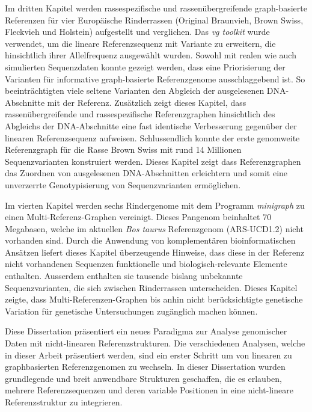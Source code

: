 \documentclass[11 pt, a4paper, notitlepage, twoside]{report}
\begin{document}
Im dritten Kapitel werden rassespezifische und rassenübergreifende  graph-basierte Referenzen für vier Europäische Rinderrassen (Original Braunvieh, Brown Swiss, Fleckvieh und Holstein) aufgestellt und verglichen. Das \emph{vg toolkit} wurde verwendet, um die lineare Referenzsequenz mit Variante zu erweitern, die hinsichtlich ihrer Allelfrequenz ausgewählt wurden. Sowohl mit realen wie auch simulierten Sequenzdaten konnte gezeigt werden, dass eine Priorisierung der Varianten für informative graph-basierte Referenzgenome ausschlaggebend ist. So beeinträchtigten viele seltene Varianten den Abgleich der ausgelesenen DNA-Abschnitte mit der Referenz. Zusätzlich zeigt dieses Kapitel, dass rassenübergreifende und rassespezifische Referenzgraphen hinsichtlich des Abgleichs der DNA-Abschnitte eine fast identische Verbesserung gegenüber der linearen Referenzsequenz  aufweisen. Schlussendlich konnte der erste genomweite Referenzgraph für die Rasse Brown Swiss mit rund 14 Millionen Sequenzvarianten konstruiert werden. Dieses Kapitel zeigt dass Referenzgraphen das Zuordnen von ausgelesenen DNA-Abschnitten erleichtern und somit eine unverzerrte Genotypisierung von Sequenzvarianten ermöglichen.

\thispagestyle{plain}

Im vierten Kapitel werden sechs Rindergenome mit dem Programm \emph{minigraph} zu einen Multi-Referenz-Graphen vereinigt. Dieses Pangenom beinhaltet 70 Megabasen, welche im aktuellen \emph{Bos taurus} Referenzgenom (ARS-UCD1.2) nicht vorhanden sind. Durch die Anwendung von komplementären bioinformatischen Ansätzen liefert dieses Kapitel überzeugende Hinweise, dass diese in der Referenz nicht vorhandenen Sequenzen funktionelle und biologisch-relevante Elemente enthalten. Ausserdem enthalten sie tausende bislang  unbekannte Sequenzvarianten, die  sich zwischen  Rinderrassen  unterscheiden. Dieses Kapitel zeigte, dass Multi-Referenzen-Graphen bis anhin nicht berücksichtigte genetische Variation für genetische Untersuchungen zugänglich machen können.

Diese Dissertation präsentiert ein neues Paradigma zur Analyse genomischer Daten mit nicht-linearen Referenzstrukturen. Die verschiedenen Analysen, welche in dieser Arbeit präsentiert werden, sind ein erster Schritt um von linearen zu graphbasierten Referenzgenomen zu wechseln. In dieser Dissertation wurden grundlegende und breit anwendbare Strukturen geschaffen, die es erlauben, mehrere Referenzsequenzen und deren variable Positionen  in eine nicht-lineare Referenzstruktur zu integrieren.
\end{document}
